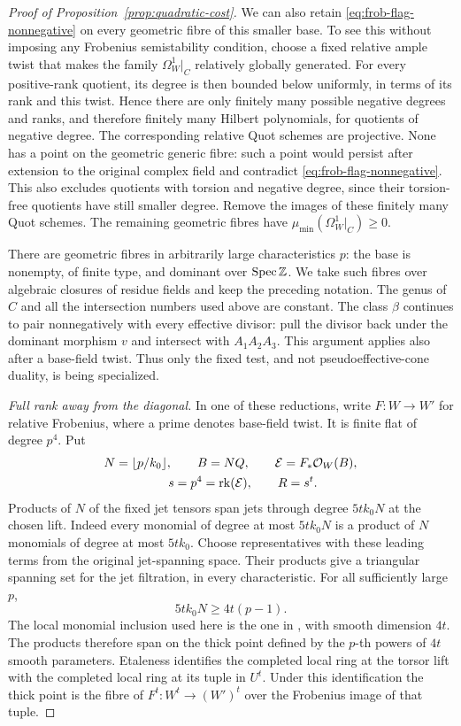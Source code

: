 \begin{proof}[Proof of Proposition~\ref{prop:quadratic-cost}]
We can also retain \eqref{eq:frob-flag-nonnegative} on every geometric
fibre of this smaller base.  To see this without imposing any
Frobenius semistability condition, choose a fixed relative ample twist
that makes the family $\Omega_W^1|_C$ relatively globally generated.
For every positive-rank quotient, its degree is then bounded below
uniformly, in terms of its rank and this twist.  Hence there are only
finitely many possible negative degrees and ranks, and therefore
finitely many Hilbert polynomials, for quotients of negative degree.
The corresponding relative Quot schemes are projective.  None has a
point on the geometric generic fibre: such a point would persist after
extension to the original complex field and contradict
\eqref{eq:frob-flag-nonnegative}.  This also excludes quotients with
torsion and negative degree, since their torsion-free quotients have
still smaller degree.  Remove the images of these finitely many Quot
schemes.  The remaining geometric fibres have
$\mu_{\min}(\Omega_W^1|_C)\ge0$.

There are geometric fibres in arbitrarily large characteristics $p$:
the base is nonempty, of finite type, and dominant over $\operatorname{Spec}\mathbb Z$.
We take such fibres over algebraic closures of residue fields and keep
the preceding notation.  The genus of $C$ and all the intersection
numbers used above are constant.  The class $\beta$ continues to pair
nonnegatively with every effective divisor: pull the divisor back
under the dominant morphism $v$ and intersect with $A_1A_2A_3$.
This argument applies also after a base-field twist.  Thus only the
fixed test, and not pseudoeffective-cone duality, is being specialized.

\emph{Full rank away from the diagonal.}
In one of these reductions, write $F:W\to W'$ for relative Frobenius,
where a prime denotes base-field twist.  It is finite flat of degree
$p^4$.  Put
\begin{equation}\label{eq:frob-ranks}
 \begin{gathered}
 N=\lfloor p/k_0\rfloor,
 \qquad B=NQ,
 \qquad \mathcal E=F_*\mathcal O_W(B),\\
 \qquad s=p^4=\operatorname{rk}(\mathcal E),
 \qquad R=s^t.
 \end{gathered}
\end{equation}
Products of $N$ of the fixed jet tensors span jets through degree
$5tk_0N$ at the chosen lift.  Indeed every monomial of degree at most
$5tk_0N$ is a product of $N$ monomials of degree at most $5tk_0$.
Choose representatives with these leading terms from the original
jet-spanning space.  Their products give a triangular spanning set for
the jet filtration, in every characteristic.  For all sufficiently
large $p$,
\[
 5tk_0N\ge4t(p-1).
\]
The local monomial inclusion used here is the one in
\cite[proof of Proposition~2.12, equation~(2.8)]{MustataSchwede2014},
with smooth dimension $4t$. The products therefore span on the thick point defined by the $p$-th
powers of $4t$ smooth parameters.  Etaleness identifies the completed
local ring at the torsor lift with the completed local ring at its
tuple in $U^t$.  Under this identification the thick point is the
fibre of $F^t:W^t\to(W')^t$ over the Frobenius image of that tuple.


\end{proof}
